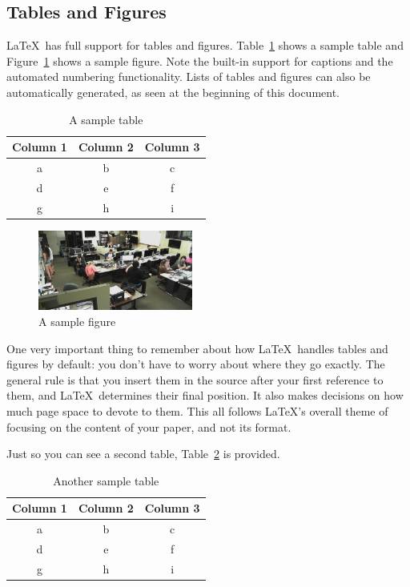 \documentclass{article}
\begin{document}
\subsection{Tables and Figures}

\LaTeX\ has full support for tables and figures.  Table~\ref{table-sample} shows a sample table and Figure~\ref{figure-sample} shows a sample figure.  Note the built-in support for captions and the automated numbering functionality.  Lists of tables and figures can also be automatically generated, as seen at the beginning of this document.

\begin{table}
\centering
\begin{tabular}{|c|c|c|}\hline
Column 1 & Column 2 & Column 3 \\\hline\hline
a & b & c \\
d & e & f \\
g & h & i \\\hline
\end{tabular}

\caption{A sample table}
\label{table-sample}
\end{table}

\begin{figure}
\centering
\includegraphics[width=2in]{space.jpg} 

\caption{A sample figure}
\label{figure-sample}
\end{figure}

One very important thing to remember about how \LaTeX\ handles tables and figures by default: you don't have to worry about where they go exactly.  The general rule is that you insert them in the source after your first reference to them, and \LaTeX\ determines their final position.  It also makes decisions on how much page space to devote to them.  This all follows \LaTeX's overall theme of focusing on the content of your paper, and not its format.

Just so you can see a second table, Table~\ref{table-sample2} is provided.

\begin{table}
\centering
\begin{tabular}{|c|c|c|}\hline
Column 1 & Column 2 & Column 3 \\\hline\hline
a & b & c \\
d & e & f \\
g & h & i \\\hline
\end{tabular}

\caption{Another sample table}
\label{table-sample2}
\end{table}
\end{document}
